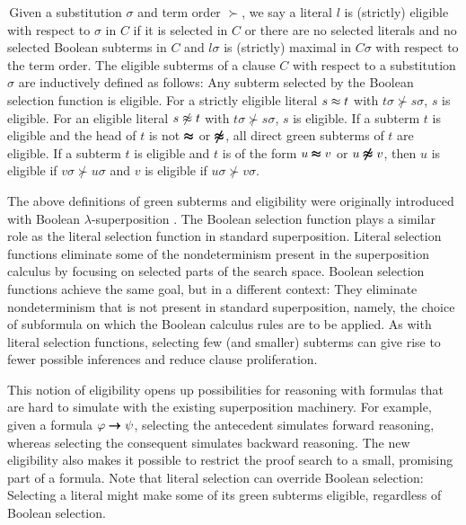 \documentclass[smallcondensed,draft]{svjour3}     %
\begin{document}
\begin{definitionx}[Eligibility]
  \,Given a substitution $\sigma$ and term order $\succ$, we say a literal $l$
  is (strictly) eligible with respect to $\sigma$ in $C$ if it is selected in
  $C$ or there are no selected literals and no selected Boolean subterms in
  $C$ and $l\sigma$ is (strictly) maximal in $C\sigma$ with respect to the
  term order.
%
  The eligible subterms of a clause $C$ with respect to a substitution
  $\sigma$ are inductively defined as follows:
  Any subterm selected by the Boolean selection function is eligible.
  For a strictly eligible literal $s \approx t$ with $t\sigma \not\succ
  s\sigma$, $s$ is eligible. For an eligible literal $s \not\approx t$ with
  $t\sigma \not\succ s\sigma$, $s$ is eligible. If a subterm $t$ is eligible
  and the head of $t$ is not $\pmb\approx$ or $\pmb{\not\approx}$, all direct green subterms of
  $t$ are eligible. If a subterm $t$ is eligible and $t$ is of the form $u
  \pmb\approx v$ or $u \pmb{\not\approx} v$, then $u$ is eligible if $v\sigma \not\succ u\sigma$
  and $v$ is eligible if $u\sigma \not\succ v\sigma$.
\end{definitionx}

The above definitions of green subterms and eligibility were originally introduced
with Boolean $\lambda$-superposition \cite{bbtv-21-full-ho-sup}.
The Boolean selection function plays a similar role as the literal
selection function in standard superposition.
Literal selection functions eliminate some of the nondeterminism present in the superposition
calculus by focusing on selected parts of the search space. Boolean selection functions achieve
the same goal, but in a different context: They eliminate nondeterminism that is not
present in standard superposition, namely, the choice of subformula on which 
the Boolean calculus rules are to be applied. As with literal selection functions,
selecting few (and smaller) subterms can give rise to fewer possible inferences
and reduce clause proliferation.

%
This notion of eligibility opens up possibilities for reasoning with
formulas that are hard to simulate with the existing superposition machinery.
For example, given a formula $\varphi \pmb\rightarrow \psi$, selecting the antecedent
simulates forward reasoning, whereas selecting the consequent simulates backward
reasoning. The new eligibility also makes it possible to restrict the proof
search to a small, promising part of a formula. Note that
literal selection can override Boolean selection: Selecting a literal 
might make some of its green subterms eligible, regardless
of Boolean selection.
\end{document}
